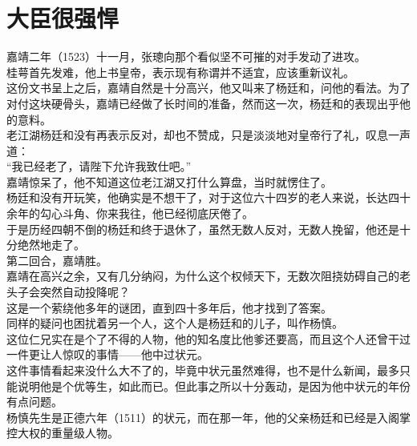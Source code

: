 \section{大臣很强悍}
\ifnum{}
	\begin{multicols}{\theparacolNo}
\fi
嘉靖二年（1523）十一月，张璁向那个看似坚不可摧的对手发动了进攻。\\

桂萼首先发难，他上书皇帝，表示现有称谓并不适宜，应该重新议礼。\\

这份文书呈上之后，嘉靖自然是十分高兴，他又叫来了杨廷和，问他的看法。为了对付这块硬骨头，嘉靖已经做了长时间的准备，然而这一次，杨廷和的表现出乎他的意料。\\

老江湖杨廷和没有再表示反对，却也不赞成，只是淡淡地对皇帝行了礼，叹息一声道：\\

“我已经老了，请陛下允许我致仕吧。”\\

嘉靖惊呆了，他不知道这位老江湖又打什么算盘，当时就愣住了。\\

杨廷和没有开玩笑，他确实是不想干了，对于这位六十四岁的老人来说，长达四十余年的勾心斗角、你来我往，他已经彻底厌倦了。\\

于是历经四朝不倒的杨廷和终于退休了，虽然无数人反对，无数人挽留，他还是十分绝然地走了。\\

第二回合，嘉靖胜。\\

嘉靖在高兴之余，又有几分纳闷，为什么这个权倾天下，无数次阻挠妨碍自己的老头子会突然自动投降呢？\\

这是一个萦绕他多年的谜团，直到四十多年后，他才找到了答案。\\

同样的疑问也困扰着另一个人，这个人是杨廷和的儿子，叫作杨慎。\\

这位仁兄实在是个了不得的人物，他的知名度比他爹还要高，而且这个人还曾干过一件更让人惊叹的事情——他中过状元。\\

这件事情看起来没什么大不了的，毕竟中状元虽然难得，也不是什么新闻，最多只能说明他是个优等生，如此而已。但此事之所以十分轰动，是因为他中状元的年份有点问题。\\

杨慎先生是正德六年（1511）的状元，而在那一年，他的父亲杨廷和已经是入阁掌控大权的重量级人物。\\


\end{multicols}
